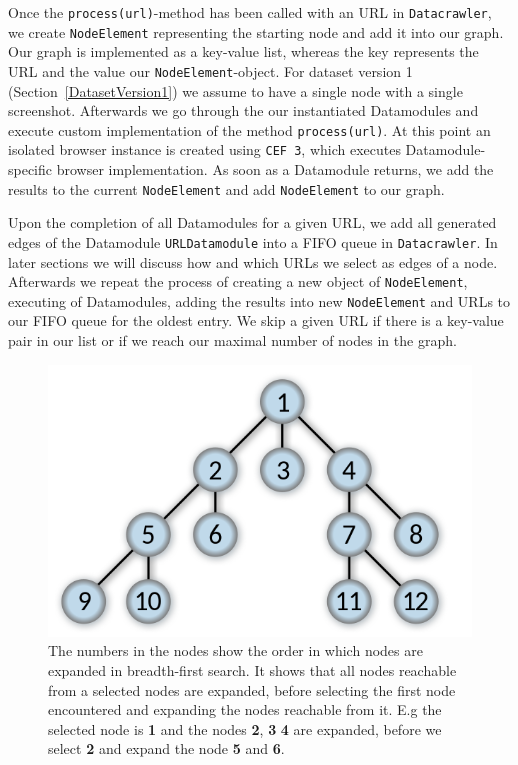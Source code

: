 Once the \texttt{process(url)}-method has been called with an URL in \texttt{Datacrawler}, we create \texttt{NodeElement} representing the starting node and add it into our graph. Our graph is implemented as a key-value list, whereas the key represents the URL and the value our \texttt{NodeElement}-object. For dataset version 1 (Section~\ref{DatasetVersion1}) we assume to have a single node with a single screenshot. Afterwards we go through the our instantiated Datamodules and execute custom implementation of the method \texttt{process(url)}. At this point an isolated browser instance is created using \texttt{CEF 3}, which executes Datamodule-specific browser implementation. As soon as a Datamodule returns, we add the results to the current \texttt{NodeElement} and add \texttt{NodeElement} to our graph. 

Upon the completion of all Datamodules for a given URL, we add all generated edges of the Datamodule \texttt{URLDatamodule} into a FIFO queue in \texttt{Datacrawler}. In later sections we will discuss how and which URLs we select as edges of a node. Afterwards we repeat the process of creating a new object of \texttt{NodeElement}, executing of Datamodules, adding the results into new \texttt{NodeElement} and URLs to our FIFO queue for the oldest entry. We skip a given URL if there is a key-value pair in our list or if we reach our maximal number of nodes in the graph.

\begin{figure}
	\centering
	\includegraphics[scale=0.35]{resources/breadth-first}
	\caption[Illustration of the Breadth-First-Search Algorithm]{ The numbers in the nodes show the order in which nodes are expanded in breadth-first search. It shows that all nodes reachable from a selected nodes are expanded, before selecting the first node encountered and expanding the nodes reachable from it. E.g the selected node is \textbf{1} and the nodes \textbf{2}, \textbf{3} \textbf{4} are expanded, before we select \textbf{2} and expand the node \textbf{5} and \textbf{6}.}
	\label{datacrawler_breadth_search}
\end{figure}

